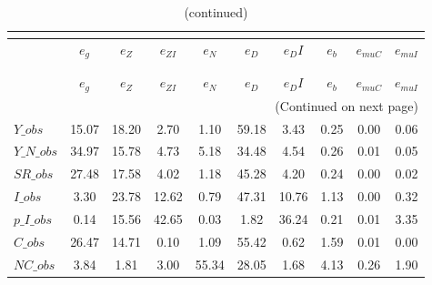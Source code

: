  
\begin{center}
\begin{longtable}{lccccccccc} 
\caption{VARIANCE DECOMPOSITION (in percent)}\\
 \label{Table:th_var_decomp_uncond}\\
\toprule 
$               $	 & 	 $        {e_g}$	 & 	 $        {e_Z}$	 & 	 $     {e_{ZI}}$	 & 	 $        {e_N}$	 & 	 $        {e_D}$	 & 	 $       {e_DI}$	 & 	 $        {e_b}$	 & 	 $    {e_{muC}}$	 & 	 $    {e_{muI}}$\\
\midrule \endfirsthead 
\caption{(continued)}\\
 \toprule \\ 
$               $	 & 	 $        {e_g}$	 & 	 $        {e_Z}$	 & 	 $     {e_{ZI}}$	 & 	 $        {e_N}$	 & 	 $        {e_D}$	 & 	 $       {e_DI}$	 & 	 $        {e_b}$	 & 	 $    {e_{muC}}$	 & 	 $    {e_{muI}}$\\
\midrule \endhead 
\midrule \multicolumn{10}{r}{(Continued on next page)} \\ \bottomrule \endfoot 
\bottomrule \endlastfoot 
$Y\_obs         $	 & 	        15.07	 & 	        18.20	 & 	         2.70	 & 	         1.10	 & 	        59.18	 & 	         3.43	 & 	         0.25	 & 	         0.00	 & 	         0.06 \\ 
$Y\_N\_obs      $	 & 	        34.97	 & 	        15.78	 & 	         4.73	 & 	         5.18	 & 	        34.48	 & 	         4.54	 & 	         0.26	 & 	         0.01	 & 	         0.05 \\ 
$SR\_obs        $	 & 	        27.48	 & 	        17.58	 & 	         4.02	 & 	         1.18	 & 	        45.28	 & 	         4.20	 & 	         0.24	 & 	         0.00	 & 	         0.02 \\ 
$I\_obs         $	 & 	         3.30	 & 	        23.78	 & 	        12.62	 & 	         0.79	 & 	        47.31	 & 	        10.76	 & 	         1.13	 & 	         0.00	 & 	         0.32 \\ 
$p\_I\_obs      $	 & 	         0.14	 & 	        15.56	 & 	        42.65	 & 	         0.03	 & 	         1.82	 & 	        36.24	 & 	         0.21	 & 	         0.01	 & 	         3.35 \\ 
$C\_obs         $	 & 	        26.47	 & 	        14.71	 & 	         0.10	 & 	         1.09	 & 	        55.42	 & 	         0.62	 & 	         1.59	 & 	         0.01	 & 	         0.00 \\ 
$NC\_obs        $	 & 	         3.84	 & 	         1.81	 & 	         3.00	 & 	        55.34	 & 	        28.05	 & 	         1.68	 & 	         4.13	 & 	         0.26	 & 	         1.90 \\ 

\end{longtable}
\end{center}
